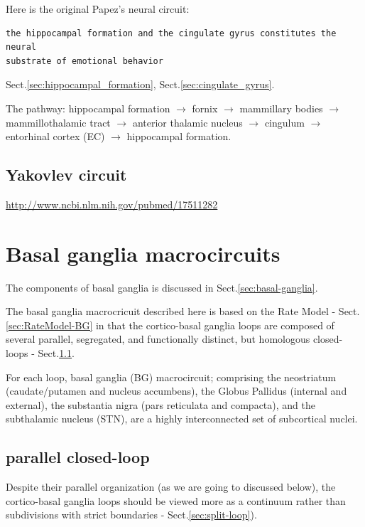 Here is the original Papez's neural circuit:
\begin{verbatim}
the hippocampal formation and the cingulate gyrus constitutes the neural
substrate of emotional behavior
\end{verbatim}
Sect.\ref{sec:hippocampal_formation}, Sect.\ref{sec:cingulate_gyrus}.

The pathway:  hippocampal formation $\rightarrow$ fornix $\rightarrow$
mammillary bodies $\rightarrow$ mammillothalamic tract
$\rightarrow$ anterior thalamic nucleus $\rightarrow$ cingulum
$\rightarrow$ entorhinal cortex (EC) $\rightarrow$ hippocampal formation.




\subsection{Yakovlev circuit}
\label{sec:Yakovlev-circuit}

\url{http://www.ncbi.nlm.nih.gov/pubmed/17511282}

\section{Basal ganglia macrocircuits}
\label{sec:basal-ganglia-macrocircuit}

The components of basal ganglia is discussed in Sect.\ref{sec:basal-ganglia}.

The basal ganglia macrocricuit described here is based on the Rate Model -
Sect.\ref{sec:RateModel-BG} in that the cortico-basal ganglia loops are composed
of several parallel, segregated, and functionally distinct, but homologous
closed-loops - Sect.\ref{sec:basal-ganglia-parallel-closed-loop}. 

For each loop, basal ganglia (BG) macrocircuit; comprising the
neostriatum (caudate/putamen and nucleus accumbens), the Globus Pallidus
(internal and external), the substantia nigra (pars reticulata and compacta),
and the subthalamic nucleus (STN), are a highly interconnected set of
subcortical nuclei.

\subsection{parallel closed-loop}
\label{sec:basal-ganglia-parallel-closed-loop}


\begin{mdframed}
Despite their parallel organization (as we are going to discussed below), the
cortico-basal ganglia loops should be viewed more as a continuum rather than
subdivisions with strict boundaries - Sect.\ref{sec:split-loop}).

\end{mdframed}

